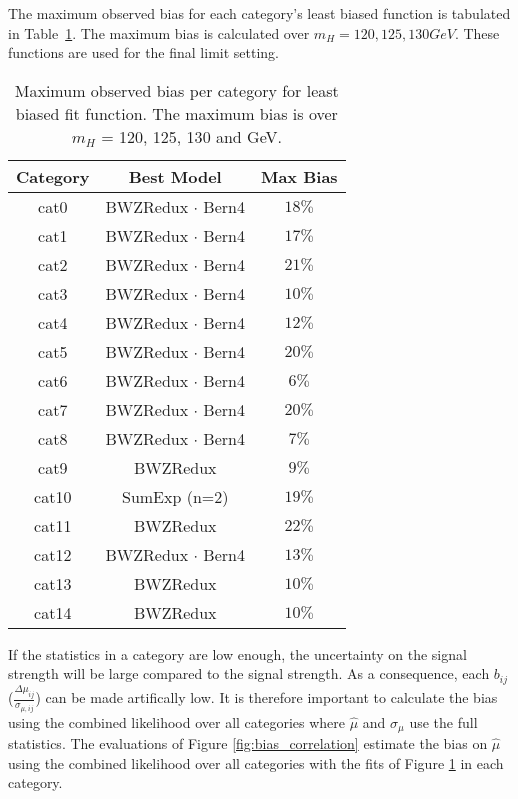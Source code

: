 The maximum observed bias for each category's least biased function is tabulated in Table~\ref{tab:bias}. The maximum bias is calculated over $m_H = 120, 125, 130 GeV$. These functions are used for the final limit setting. 
\begin{table}[h!]
    \centering
    \caption[Maximum bias of the signal strength in each category due to the chosen background model.]{Maximum observed bias per category for least biased fit function. The maximum bias is over $m_H$ = 120, 125, 130 and GeV.}
    \label{tab:bias}
    \begin{tabular}{ccc}
        \hline
        Category & Best Model & Max Bias \\
        \hline
        cat0  & BWZRedux $\cdot$ Bern4 & $18\%$ \\
        cat1  & BWZRedux $\cdot$ Bern4 & $17\%$ \\
        cat2  & BWZRedux $\cdot$ Bern4 & $21\%$ \\
        cat3  & BWZRedux $\cdot$ Bern4 & $10\%$ \\
        cat4  & BWZRedux $\cdot$ Bern4 & $12\%$ \\
        cat5  & BWZRedux $\cdot$ Bern4 & $20\%$ \\
        cat6  & BWZRedux $\cdot$ Bern4 & $6\%$  \\
        cat7  & BWZRedux $\cdot$ Bern4 & $20\%$ \\
        cat8  & BWZRedux $\cdot$ Bern4 & $7\%$  \\
        cat9  & BWZRedux               & $9\%$  \\
        cat10 & SumExp (n=2)           & $19\%$ \\
        cat11 & BWZRedux               & $22\%$ \\
        cat12 & BWZRedux $\cdot$ Bern4 & $13\%$ \\
        cat13 & BWZRedux               & $10\%$ \\
        cat14 & BWZRedux               & $10\%$ \\
        \hline
    \end{tabular}
\end{table}
If the statistics in a category are low enough, the uncertainty on the signal strength will be large compared to the signal strength. As a consequence, each $b_{ij}$ ($\frac{\Delta\mu_{ij}}{\sigma_{\mu,ij}}$) can be made artifically low. It is therefore important to calculate the bias using the combined likelihood over all categories where $\hat{\mu}$ and $\sigma_\mu$ use the full statistics. The evaluations of Figure \ref{fig:bias_correlation} estimate the bias on $\hat{\mu}$ using the combined likelihood over all categories with the fits of Figure \ref{tab:bias} in each category.  
